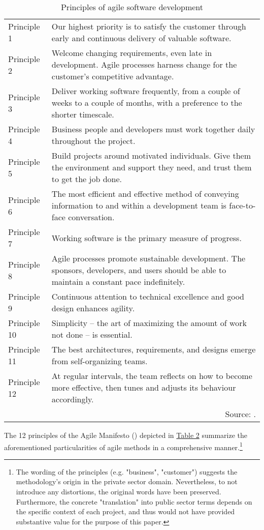 %
\begin{table}[htbp!]
	\centering
	\caption{Principles of agile software development}\label{tab: Principles of agile software development}
	\renewcommand{\arraystretch}{1.4}
	\begin{tabular}{ p{2cm} p{14cm} }
		\hline
		Principle 1	& Our highest priority is to satisfy the customer through early and continuous delivery of valuable software.\\
		Principle 2	& Welcome changing requirements, even late in development. Agile processes harness change for the customer's competitive advantage.\\
		Principle 3 &	Deliver working software frequently, from a
		couple of weeks to a couple of months, with a preference to the shorter timescale.\\
		Principle 4	& Business people and developers must work
		together daily throughout the project.\\
		Principle 5	& Build projects around motivated individuals.
		Give them the environment and support they need, and trust them to get the job done.
		\\
		Principle 6	& The most efficient and effective method of
		conveying information to and within a development team is face-to-face conversation.
		\\
		Principle 7	& Working software is the primary measure of progress.\\
		Principle 8	& Agile processes promote sustainable development. The sponsors, developers, and users should be able to maintain a constant pace indefinitely.
		\\
		Principle 9	& Continuous attention to technical excellence
		and good design enhances agility.\\
		Principle 10 & Simplicity – the art of maximizing the amount of work not done – is essential.\\
		Principle 11 & The best architectures, requirements, and designs emerge from self-organizing teams.
		\\
		Principle 12 & At regular intervals, the team reflects on how to become more effective, then tunes and adjusts its behaviour accordingly.\\
		\hline
		\multicolumn{2}{r}{Source: \cite{AgileManifesto2001}.}	
	\end{tabular}
\end{table}
%
The 12 principles of the Agile Manifesto (\cite*{AgileManifesto2001}) depicted in \hyperref[tab: Principles of agile software development]{Table 2} summarize the aforementioned particularities of agile methods in a comprehensive manner.\footnote{The wording of the principles (e.g. "business", "customer") suggests the methodology's origin in the private sector domain. Nevertheless, to not introduce any distortions, the original words have been preserved. Furthermore, the concrete "translation" into public sector terms depends on the specific context of each project, and thus would not have provided substantive value for the purpose of this paper.}